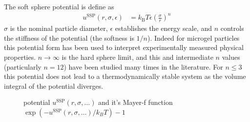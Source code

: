 The soft sphere potential is define as
\begin{align}
u^\text{SSP}(r,\sigma,\epsilon) &=
k_\text{B} T \epsilon \left(\frac{\sigma}{r}\right)^n
\end{align}
$\sigma$ is the nominal particle diameter, $\epsilon$ establishes the
energy scale, and $n$ controls the stiffness of the potential (the
softness is $1/n$). Indeed for microgel particles this potential
form has been used to interpret experimentally measured
physical properties. $n\rightarrow\infty$ is the hard sphere limit, and this
and intermediate $n$ values (particularly $n=12$) have been
studied many times in the literature. For $n\leq 3$
this potential does not lead to a thermodynamically stable
system as the volume integral of the potential diverges.



\begin{figure}[htb]
\centering
  \quad
  \caption{potential $u^\text{SSP}(r,\sigma,\ldots)$ and it's Mayer-f function $\exp(-u^\text{SSP}(r,\sigma,\ldots)/k_BT)-1$}
\end{figure}

